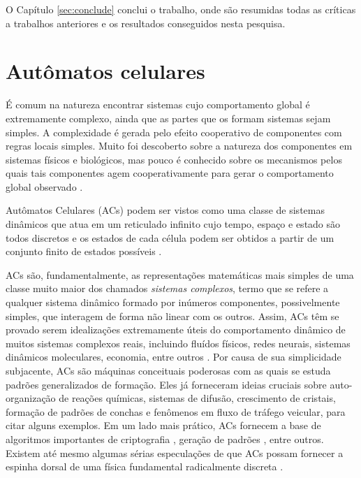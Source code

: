 \documentclass[12pt,a4paper]{article}
\begin{document}
O Capítulo \ref{sec:conclude} conclui o trabalho, onde são resumidas todas
as críticas a trabalhos anteriores e os resultados conseguidos nesta pesquisa.

\newpage

\section{Autômatos celulares}\label{sec:refteo}

É comum na natureza encontrar sistemas cujo comportamento global é extremamente
complexo, ainda que as partes que os formam sistemas sejam simples. A
complexidade é gerada pelo efeito cooperativo de componentes com regras locais
simples. Muito foi descoberto sobre a natureza dos componentes em sistemas físicos
e biológicos, mas pouco é conhecido sobre os mecanismos pelos quais tais componentes
agem cooperativamente para gerar o comportamento global observado .

Autômatos Celulares (ACs) podem ser vistos como uma classe de sistemas dinâmicos que atua
em um reticulado infinito cujo tempo, espaço e estado são todos discretos e os estados de cada célula
podem ser obtidos a partir de um conjunto finito de estados possíveis .

ACs são, fundamentalmente, as representações matemáticas mais simples
de uma classe muito maior dos chamados \textit{sistemas complexos}, termo que se refere
a qualquer sistema dinâmico formado por inúmeros componentes, possivelmente simples,
que interagem de forma não linear com os outros. Assim, ACs têm se provado
serem idealizações extremamente úteis do comportamento dinâmico de muitos sistemas
complexos reais, incluindo fluídos físicos, redes neurais, sistemas dinâmicos
moleculares, economia, entre outros . Por causa de sua
simplicidade subjacente, ACs são máquinas
conceituais poderosas com as quais se estuda padrões generalizados de formação. Eles
já forneceram ideias cruciais sobre auto-organização de reações químicas, sistemas de
difusão, crescimento de cristais, formação de padrões de conchas e fenômenos em fluxo
de tráfego veicular, para citar alguns exemplos. Em um lado mais prático, ACs
fornecem a base de algoritmos importantes de criptografia ,
geração de padrões , entre outros. Existem até mesmo
algumas sérias especulações de que ACs possam fornecer
a espinha dorsal de uma física fundamental radicalmente discreta .
\end{document}
